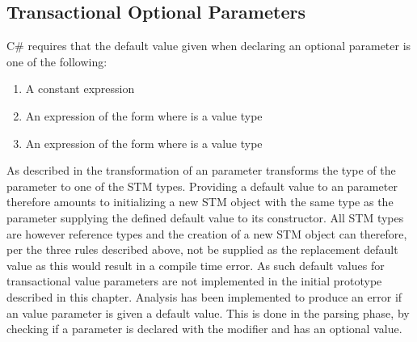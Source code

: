 \subsection{Transactional Optional Parameters}
C\# requires that the default value given when declaring an optional parameter is one of the following\cite[p. 309]{csharp2013specificaiton}:
\begin{enumerate}
	\item A constant expression
	\item An expression of the form  where  is a value type
	\item An expression of the form  where  is a value type
\end{enumerate}
As described in  the transformation of an  parameter transforms the type of the parameter to one of the \ac{STM} types. Providing a default value to an  parameter therefore amounts to initializing a new \ac{STM} object with the same type as the parameter supplying the defined default value to its constructor. All \ac{STM} types are however reference types and the creation of a new \ac{STM} object can therefore, per the three rules described above, not be supplied as the replacement default value as this would result in a compile time error. As such default values for transactional value parameters are not implemented in the initial prototype described in this chapter. Analysis has been implemented to produce an error if an  value parameter is given a default value. This is done in the parsing phase, by checking if a parameter is declared with the  modifier and has an optional value.

